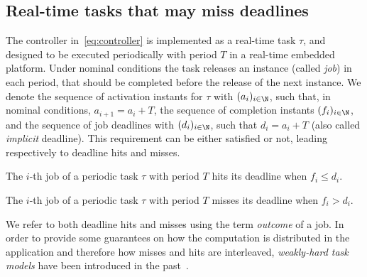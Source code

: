 \subsection{Real-time tasks that may miss deadlines}
\label{ssec:whalgebra}

The controller in~\eqref{eq:controller} is implemented as a real-time task $\tau$, and designed to be executed periodically with period $T$ in a real-time embedded platform.
Under nominal conditions the task releases an instance (called \emph{job}) in each period, that should be completed
before the release of the next instance. We denote the sequence of activation
instants for $\tau$ with $(a_i)_{i \in \N}$, such that, in nominal conditions, $a_{i+1} = a_i+T$,  the sequence of
completion instants $(f_i)_{i \in \N}$, and the sequence of job
deadlines with $(d_i)_{i \in \N}$, such that $d_i = a_i +
T$ (also called \emph{implicit} deadline).  This requirement can be either
satisfied or not, leading respectively to deadline hits and misses.

\begin{definition}%
\label{def:hit}%
    The $i$-th job of a periodic task $\tau$ with period $T$ hits its deadline when $f_i \leq d_i$.
\end{definition}

\begin{definition}%
\label{def:miss}%
    The $i$-th job of a periodic task $\tau$ with period $T$ misses its deadline when $f_i > d_i$.
\end{definition}

We refer to both deadline hits and misses using the
term \emph{outcome} of a job.  In order to provide some guarantees on
how the computation is distributed in the application and therefore how
misses and hits are interleaved, \emph{weakly-hard task models} have
been introduced in the past~\cite{Bernat:2001}. 

